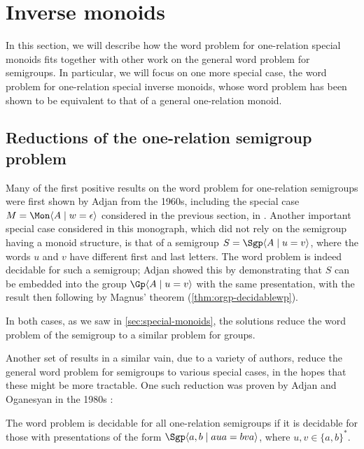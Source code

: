 \documentclass[noindex,noinsetproof,emphthm,12pt]{lmaths}
\begin{document}
\section{Inverse monoids} \label{sec:inverse-monoids}

In this section, we will describe how the word problem for one-relation special monoids fits together with other work on the general word problem for semigroups. In particular, we will focus on one more special case, the word problem for one-relation special inverse monoids, whose word problem has been shown to be equivalent to that of a general one-relation monoid.

\subsection{Reductions of the one-relation semigroup problem}
Many of the first positive results on the word problem for one-relation semigroups were first shown by Adjan from the 1960s, including the special case $M = \Mon \langle A \mid w = \epsilon\rangle$ considered in the previous section, in \cite{Adian1966}. Another important special case considered in this monograph, which did not rely on the semigroup having a monoid structure, is that of a semigroup $S = \Sgp \langle A \mid u = v\rangle$, where the words $u$ and $v$ have different first and last letters. The word problem is indeed decidable for such a semigroup; Adjan showed this by demonstrating that $S$ can be embedded into the group $\Gp \langle A \mid u = v \rangle$ with the same presentation, with the result then following by Magnus' theorem (\cref{thm:orgp-decidablewp}).

In both cases, as we saw in \cref{sec:special-monoids}, the solutions reduce the word problem of the semigroup to a similar problem for groups.

Another set of results in a similar vain, due to a variety of authors, reduce the general word problem for semigroups to various special cases, in the hopes that these might be more tractable. One such reduction was proven by Adjan and Oganesyan in the 1980s \cite{Adyan1987}:

\begin{theorem} \label{thm:aua=bva}
	The word problem is decidable for all one-relation semigroups if it is decidable for those with presentations of the form $\Sgp \langle a, b \mid aua = bva \rangle$, where $u, v \in \{a, b\}^*$.
\end{theorem}
\end{document}
